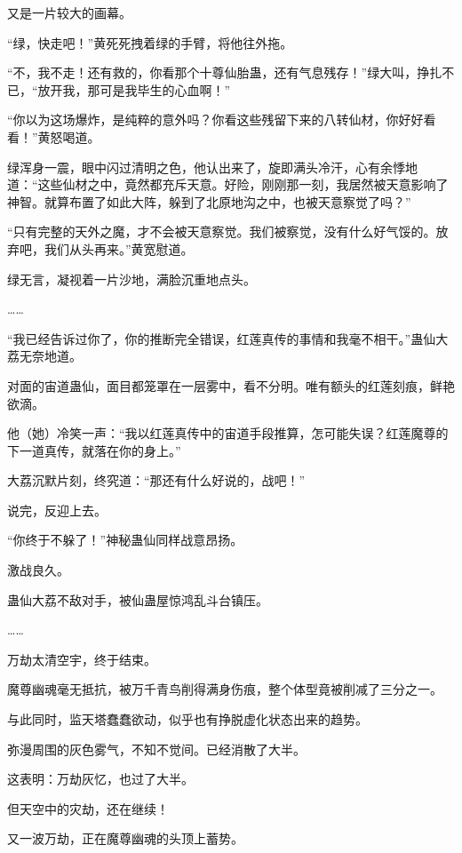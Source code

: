 
\begin{this_body}



又是一片较大的画幕。

“绿，快走吧！”黄死死拽着绿的手臂，将他往外拖。

“不，我不走！还有救的，你看那个十尊仙胎蛊，还有气息残存！”绿大叫，挣扎不已，“放开我，那可是我毕生的心血啊！”

“你以为这场爆炸，是纯粹的意外吗？你看这些残留下来的八转仙材，你好好看看！”黄怒喝道。

绿浑身一震，眼中闪过清明之色，他认出来了，旋即满头冷汗，心有余悸地道：“这些仙材之中，竟然都充斥天意。好险，刚刚那一刻，我居然被天意影响了神智。就算布置了如此大阵，躲到了北原地沟之中，也被天意察觉了吗？”

“只有完整的天外之魔，才不会被天意察觉。我们被察觉，没有什么好气馁的。放弃吧，我们从头再来。”黄宽慰道。

绿无言，凝视着一片沙地，满脸沉重地点头。

……

“我已经告诉过你了，你的推断完全错误，红莲真传的事情和我毫不相干。”蛊仙大荔无奈地道。

对面的宙道蛊仙，面目都笼罩在一层雾中，看不分明。唯有额头的红莲刻痕，鲜艳欲滴。

他（她）冷笑一声：“我以红莲真传中的宙道手段推算，怎可能失误？红莲魔尊的下一道真传，就落在你的身上。”

大荔沉默片刻，终究道：“那还有什么好说的，战吧！”

说完，反迎上去。

“你终于不躲了！”神秘蛊仙同样战意昂扬。

激战良久。

蛊仙大荔不敌对手，被仙蛊屋惊鸿乱斗台镇压。

……

万劫太清空宇，终于结束。

魔尊幽魂毫无抵抗，被万千青鸟削得满身伤痕，整个体型竟被削减了三分之一。

与此同时，监天塔蠢蠢欲动，似乎也有挣脱虚化状态出来的趋势。

弥漫周围的灰色雾气，不知不觉间。已经消散了大半。

这表明：万劫灰忆，也过了大半。

但天空中的灾劫，还在继续！

又一波万劫，正在魔尊幽魂的头顶上蓄势。


\end{this_body}
